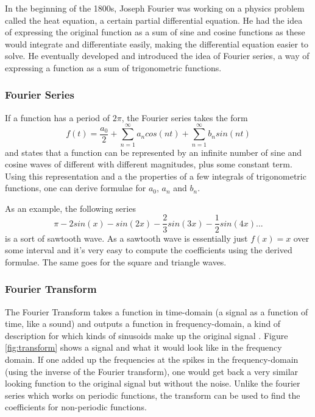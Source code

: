In the beginning of the 1800s, Joseph Fourier was working on a physics problem called the heat equation, a certain partial differential equation. He had the idea of expressing the original function as a sum of sine and cosine functions as these would integrate and differentiate easily, making the differential equation easier to solve. He eventually developed and introduced the idea of Fourier series, a way of expressing a function as a sum of trigonometric functions. 
\subsubsection{Fourier Series} 
If a function has a period of $2\pi$, the Fourier series takes the form $$f(t) = \frac{a_0}{2} + \sum_{n=1}^{\infty}a_ncos(nt)+\sum_{n=1}^{\infty}b_nsin(nt)$$ and states that a function can be represented by an infinite number of sine and cosine waves of different with different magnitudes, plus some constant term. Using this representation and a the properties of a few integrals of trigonometric functions, one can derive formulae for $a_0$, $a_n$ and $b_n$.

As an example, the following series $$\pi -2sin(x) -sin(2x) -\frac{2}{3}sin(3x) -\frac{1}{2}sin(4x) ... $$ is a sort of sawtooth wave. As a sawtooth wave is essentially just $f(x) = x$ over some interval and it's very easy to compute the coefficients using the derived formulae. The same goes for the square and triangle waves.
 
\subsubsection{Fourier Transform} 
The Fourier Transform takes a function in time-domain (a signal as a function of time, like a sound) and outputs a function in frequency-domain, a kind of description for which kinds of sinusoids make up the original signal \cite{SimonXu2015}. Figure \ref{fig:transform} shows a signal and what it would look like in the frequency domain. If one added up the frequencies at the spikes in the frequency-domain (using the inverse of the Fourier transform), one would get back a very similar looking function to the original signal but without the noise. Unlike the fourier series which works on periodic functions, the transform can be used to find the coefficients for non-periodic functions.


